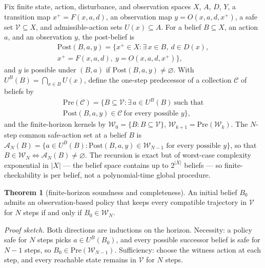 \documentclass[10pt,twocolumn]{article}
\theoremstyle{definition}
\newtheorem{theorem}{Theorem}
\begin{document}
Fix finite state, action, disturbance, and observation spaces \(X\),
\(A\), \(D\), \(Y\), a transition map \(x^+ = F(x,a,d)\), an observation
map \(y = O(x,a,d,x^+)\), a safe set \(\mathcal V\subseteq X\), and
admissible-action sets \(U(x)\subseteq A\). For a belief \(B\subseteq X\),
an action \(a\), and an observation \(y\), the post-belief is
\[
\begin{gathered}
\mathrm{Post}(B,a,y) = \bigl\{ x^+\in X : \exists\, x\in B,\ d\in D(x), \\
x^+ = F(x,a,d),\ y = O(x,a,d,x^+) \bigr\},
\end{gathered}
\]
and \(y\) is possible under \((B,a)\) if \(\mathrm{Post}(B,a,y)\neq\varnothing\).
With \(U^B(B)=\bigcap_{x\in B}U(x)\), define the one-step predecessor of a
collection \(\mathcal C\) of beliefs by
\[
\begin{gathered}
\mathrm{Pre}(\mathcal C) = \bigl\{ B\subseteq\mathcal V : \exists\, a\in U^B(B)\ \text{such that}\\
\mathrm{Post}(B,a,y)\in\mathcal C\ \text{for every possible } y \bigr\},
\end{gathered}
\]
and the finite-horizon kernels by \(\mathcal W_0 = \{B : B\subseteq\mathcal V\}\),
\(\mathcal W_{k+1} = \mathrm{Pre}(\mathcal W_k)\).
The \(N\)-step common safe-action set at a belief \(B\) is
\(\mathcal{A}_N(B) = \bigl\{ a \in U^B(B) : \mathrm{Post}(B,a,y) \in \mathcal W_{N-1} \text{ for every possible } y \bigr\}\),
so that \(B \in \mathcal W_N \iff \mathcal{A}_N(B) \neq \varnothing\). The recursion is exact but of worst-case complexity exponential in
\(|X|\) --- the belief space contains up to \(2^{|X|}\) beliefs --- so
finite-checkability is per belief, not a polynomial-time global procedure.

\begin{theorem}[finite-horizon soundness and completeness]\label{thm:finite-horizon}
An initial belief \(B_0\) admits an observation-based policy that keeps
every compatible trajectory in \(\mathcal V\) for \(N\) steps if and only
if \(B_0\in\mathcal W_N\).
\end{theorem}

\emph{Proof sketch.} Both directions are inductions on the horizon. Necessity: a policy safe for \(N\) steps picks \(a \in U^B(B_0)\), and every possible successor belief is safe for \(N - 1\) steps, so \(B_0 \in \mathrm{Pre}(\mathcal{W}_{N-1})\). Sufficiency: choose the witness action at each step, and every reachable state remains in \(\mathcal{V}\) for \(N\) steps.
\end{document}
